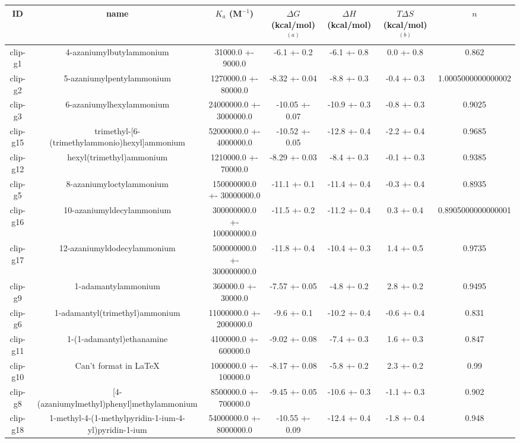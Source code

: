 \documentclass{article}
\begin{document}
\begin{center}
\begin{tabu}{| c | c | c | c | c | c | c |}
\hline
\rowfont{\bfseries} ID & name & $K_a$ (M$^{-1}$) & $\Delta G$ (kcal/mol) $^{(a)}$ & $\Delta H$ (kcal/mol) & $T\Delta S$ (kcal/mol) $^{(b)}$ & $n$ \\
\hline
\hline
clip-g1 & 4-azaniumylbutylammonium & 31000.0 +- 9000.0 & -6.1 +- 0.2 & -6.1 +- 0.8 & 0.0 +- 0.8 & 0.862 \\
\hline
clip-g2 & 5-azaniumylpentylammonium & 1270000.0 +- 80000.0 & -8.32 +- 0.04 & -8.8 +- 0.3 & -0.4 +- 0.3 & 1.0005000000000002 \\
\hline
clip-g3 & 6-azaniumylhexylammonium & 24000000.0 +- 3000000.0 & -10.05 +- 0.07 & -10.9 +- 0.3 & -0.8 +- 0.3 & 0.9025 \\
\hline
clip-g15 & trimethyl-[6-(trimethylammonio)hexyl]ammonium & 52000000.0 +- 4000000.0 & -10.52 +- 0.05 & -12.8 +- 0.4 & -2.2 +- 0.4 & 0.9685 \\
\hline
clip-g12 & hexyl(trimethyl)ammonium & 1210000.0 +- 70000.0 & -8.29 +- 0.03 & -8.4 +- 0.3 & -0.1 +- 0.3 & 0.9385 \\
\hline
clip-g5 & 8-azaniumyloctylammonium & 150000000.0 +- 30000000.0 & -11.1 +- 0.1 & -11.4 +- 0.4 & -0.3 +- 0.4 & 0.8935 \\
\hline
clip-g16 & 10-azaniumyldecylammonium & 300000000.0 +- 100000000.0 & -11.5 +- 0.2 & -11.2 +- 0.4 & 0.3 +- 0.4 & 0.8905000000000001 \\
\hline
clip-g17 & 12-azaniumyldodecylammonium & 500000000.0 +- 300000000.0 & -11.8 +- 0.4 & -10.4 +- 0.3 & 1.4 +- 0.5 & 0.9735 \\
\hline
clip-g9 & 1-adamantylammonium & 360000.0 +- 30000.0 & -7.57 +- 0.05 & -4.8 +- 0.2 & 2.8 +- 0.2 & 0.9495 \\
\hline
clip-g6 & 1-adamantyl(trimethyl)ammonium & 11000000.0 +- 2000000.0 & -9.6 +- 0.1 & -10.2 +- 0.4 & -0.6 +- 0.4 & 0.831 \\
\hline
clip-g11 & 1-(1-adamantyl)ethanamine & 4100000.0 +- 600000.0 & -9.02 +- 0.08 & -7.4 +- 0.3 & 1.6 +- 0.3 & 0.847 \\
\hline
clip-g10 & Can't format in LaTeX & 1000000.0 +- 100000.0 & -8.17 +- 0.08 & -5.8 +- 0.2 & 2.3 +- 0.2 & 0.99 \\
\hline
clip-g8 & [4-(azaniumylmethyl)phenyl]methylammonium & 8500000.0 +- 700000.0 & -9.45 +- 0.05 & -10.6 +- 0.3 & -1.1 +- 0.3 & 0.902 \\
\hline
clip-g18 & 1-methyl-4-(1-methylpyridin-1-ium-4-yl)pyridin-1-ium & 54000000.0 +- 8000000.0 & -10.55 +- 0.09 & -12.4 +- 0.4 & -1.8 +- 0.4 & 0.948 \\

\end{tabu}
\end{center}
\end{document}
